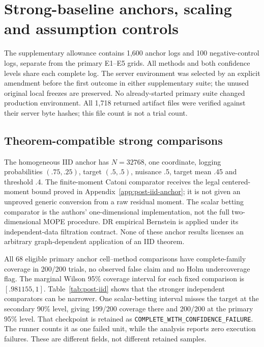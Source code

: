 \section{Strong-baseline anchors, scaling and assumption controls}
\label{app:post-supplementary}

The supplementary allowance contains 1,600 anchor logs and 100 negative-control
logs, separate from the primary E1--E5 grids. All methods and both confidence
levels share each complete log. The server environment was selected by an
explicit amendment before the first outcome in either supplementary suite;
the unused original local freezes are preserved. No already-started primary
suite changed production environment. All 1,718 returned artifact files were
verified against their server byte hashes; this file count is not a trial count.

\subsection{Theorem-compatible strong comparisons}

The homogeneous IID anchor has $N=32768$, one coordinate, logging probabilities
$(.75,.25)$, target $(.5,.5)$, nuisance .5, target mean .45 and threshold .4.
The finite-moment Catoni comparator receives the legal centered-moment bound
proved in Appendix~\ref{app:post-iid-anchor}; it is not given an unproved generic
conversion from a raw residual moment. The scalar betting comparator is the
authors' one-dimensional implementation, not the full two-dimensional MOPE
procedure. DR empirical Bernstein is applied under its independent-data
filtration contract. None of these anchor results licenses an arbitrary
graph-dependent application of an IID theorem.

All 68 eligible primary anchor cell--method comparisons have complete-family
coverage in 200/200 trials, no observed false claim and no Holm undercoverage
flag. The marginal Wilson 95\% coverage interval for each fixed comparison is
$[.981155,1]$. Table~\ref{tab:post-iid} shows that the stronger independent
comparators can be narrower. One scalar-betting interval misses the target at
the secondary 90\% level, giving 199/200 coverage there and 200/200 at the
primary 95\% level. That checkpoint is retained as
\texttt{COMPLETE\_WITH\_CONFIDENCE\_FAILURE}. The runner counts it as one failed
unit, while the analysis reports zero execution failures. These are different
fields, not different retained samples.

